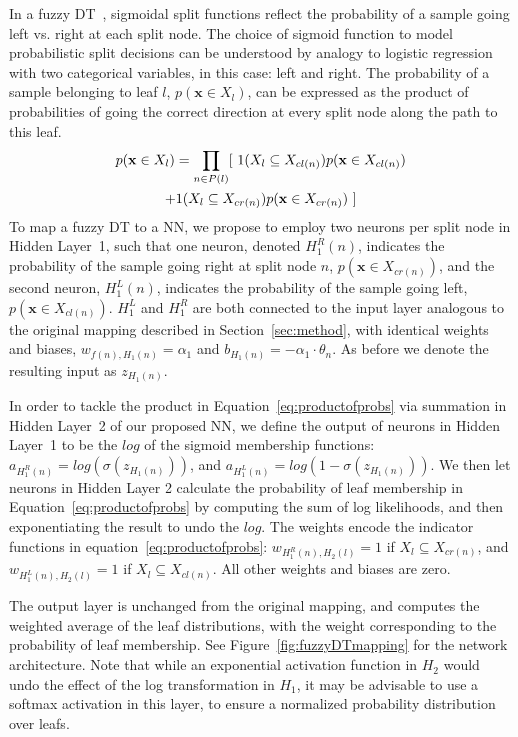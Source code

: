 \documentclass[twocolumn]{svjour3}
\begin{document}
In a fuzzy DT~\cite{SuarezL99}, 
sigmoidal split functions reflect the probability of a sample going left vs. right at each split node. %
The choice of sigmoid function to model probabilistic split decisions can be understood by analogy to logistic regression with two categorical variables, in this case: left and right.
The probability of a sample belonging to leaf $l$, $p(\mathbf{x} \in X_l)$, can be expressed as the product of probabilities of going the correct direction at every split node along the path to this leaf.
\begin{multline}
	p(\mathbf{x} \in X_l) = \prod_{n \in P(l)} 
	[\ \textnormal{1}(X_l \subseteq X_{cl(n)})p(\mathbf{x} \in X_{cl(n)}) \\
	+ \textnormal{1}(X_l \subseteq X_{cr(n)})p(\mathbf{x} \in X_{cr(n)})\ ]
\label{eq:productofprobs}
\end{multline}
To map a fuzzy DT to a NN, we propose to employ two neurons per split node in Hidden Layer~1, such that one neuron, denoted $H^R_1(n)$, indicates the probability of the sample going right at split node $n$, $p(\mathbf{x} \in X_{cr(n)})$,
and the second neuron, $H^L_1(n)$, indicates the probability of the sample going left,
$p(\mathbf{x} \in X_{cl(n)})$. 
$H^L_1$ and $H^R_1$ are both connected to the input layer analogous to the original mapping described in Section~\ref{sec:method}, with identical weights and biases, $w_{{f(n)},H_1(n)} = \alpha_1$ and $b_{H_1(n)} = -\alpha_1 \cdot \theta_n$. As before we denote the resulting input as $z_{H_1(n)}$. 

In order to tackle the product in Equation~\ref{eq:productofprobs} via summation in Hidden Layer~2 of our proposed NN, we define the output of neurons in Hidden Layer~1 to be the $log$ of the sigmoid membership functions: 
$a_{H^R_1(n)}=log(\sigma(z_{H_1(n)}))$, and $a_{H^L_1(n)}=log(1-\sigma(z_{H_1(n)}))$.
We then let neurons in Hidden Layer 2 calculate the probability of leaf membership in Equation~\ref{eq:productofprobs} by computing the sum of log likelihoods, and then exponentiating the result to undo the $log$. 
The weights encode the indicator functions in equation~\ref{eq:productofprobs}: $w_{H^R_1(n),H_2(l)} = 1$ if $X_l \subseteq X_{cr(n)}$, and $w_{H^L_1(n),H_2(l)} = 1$ if $X_l \subseteq X_{cl(n)}$.
All other weights and biases are zero.

The output layer is unchanged from the original mapping, and computes the weighted average of the leaf distributions, with the weight corresponding to the probability of leaf membership.  
See Figure~\ref{fig:fuzzyDTmapping} for the network architecture.
Note that while an exponential activation function in $H_2$ would undo the effect of the log transformation in $H_1$, it may be advisable to use a softmax activation in this layer, to ensure a normalized probability distribution over leafs.
\end{document}
